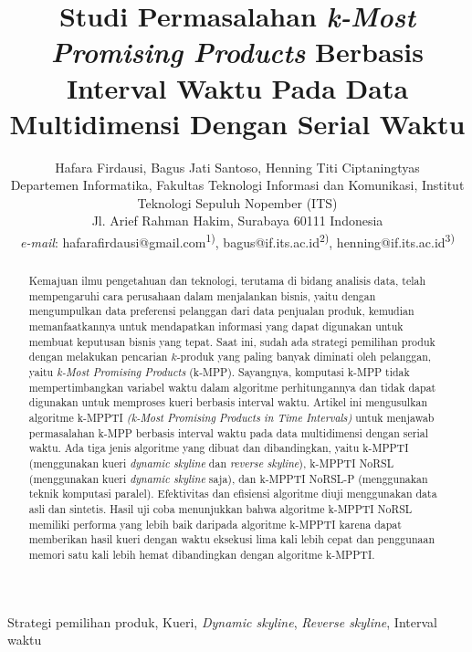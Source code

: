 \documentclass[conference]{IEEEtran}
\begin{document}
\title{Studi Permasalahan \textit{k-Most Promising Products} Berbasis Interval Waktu Pada Data Multidimensi Dengan Serial Waktu}
\author{Hafara Firdausi, Bagus Jati Santoso, Henning Titi Ciptaningtyas\\
Departemen Informatika, Fakultas Teknologi Informasi dan Komunikasi, Institut Teknologi Sepuluh Nopember (ITS)\\
Jl. Arief Rahman Hakim, Surabaya 60111 Indonesia\\
\textit{e-mail}: hafarafirdausi@gmail.com\textsuperscript{1)}, bagus@if.its.ac.id\textsuperscript{2)}, henning@if.its.ac.id\textsuperscript{3)}
}

\maketitle

\renewcommand\abstractname{\textit{Abstrak}}
\renewcommand\IEEEkeywordsname{Kata kunci}

\begin{abstract}
Kemajuan ilmu pengetahuan dan teknologi, terutama di bidang analisis data, telah mempengaruhi cara perusahaan dalam menjalankan bisnis, yaitu dengan mengumpulkan data preferensi pelanggan dari data penjualan produk, kemudian memanfaatkannya untuk mendapatkan informasi yang dapat digunakan untuk membuat keputusan bisnis yang tepat. Saat ini, sudah ada strategi pemilihan produk dengan melakukan pencarian $k$-produk yang paling banyak diminati oleh pelanggan, yaitu \textit{k-Most Promising Products} (k-MPP). Sayangnya, komputasi k-MPP tidak mempertimbangkan variabel waktu dalam algoritme perhitungannya dan tidak dapat digunakan untuk memproses kueri berbasis interval waktu. Artikel ini mengusulkan algoritme k-MPPTI \textit{(k-Most Promising Products in Time Intervals)} untuk menjawab permasalahan k-MPP berbasis interval waktu pada data multidimensi dengan serial waktu. Ada tiga jenis algoritme yang dibuat dan dibandingkan, yaitu k-MPPTI (menggunakan kueri \textit{dynamic skyline} dan \textit{reverse skyline}), k-MPPTI NoRSL (menggunakan kueri \textit{dynamic skyline} saja), dan k-MPPTI NoRSL-P (menggunakan teknik komputasi paralel). Efektivitas dan efisiensi algoritme diuji menggunakan data asli dan sintetis. Hasil uji coba menunjukkan bahwa algoritme k-MPPTI NoRSL memiliki performa yang lebih baik daripada algoritme k-MPPTI karena dapat memberikan hasil kueri dengan waktu eksekusi lima kali lebih cepat dan penggunaan memori satu kali lebih hemat dibandingkan dengan algoritme k-MPPTI.
\end{abstract}
\vspace{0.3cm}
\begin{IEEEkeywords}
Strategi pemilihan produk, Kueri, \textit{Dynamic skyline}, \textit{Reverse skyline}, Interval waktu
\end{IEEEkeywords}
\end{document}
